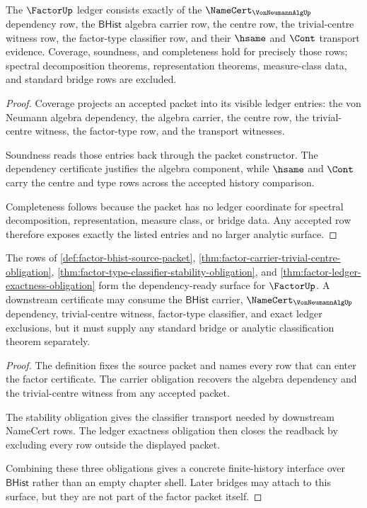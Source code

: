 \begin{theorem}
\label{thm:factor-ledger-exactness-obligation}
The $\FactorUp$ ledger consists exactly of the
$\NameCert_{\VonNeumannAlgUp}$ dependency row, the $\mathsf{BHist}$ algebra
carrier row, the centre row, the trivial-centre witness row, the factor-type
classifier row, and their $\hsame$ and $\Cont$ transport evidence. Coverage,
soundness, and completeness hold for precisely those rows; spectral
decomposition theorems, representation theorems, measure-class data, and
standard bridge rows are excluded.
\end{theorem}
\begin{proof}
Coverage projects an accepted packet into its visible ledger entries: the
von Neumann algebra dependency, the algebra carrier, the centre row, the
trivial-centre witness, the factor-type row, and the transport witnesses.

Soundness reads those entries back through the packet constructor. The
dependency certificate justifies the algebra component, while $\hsame$ and
$\Cont$ carry the centre and type rows across the accepted history comparison.

Completeness follows because the packet has no ledger coordinate for spectral
decomposition, representation, measure class, or bridge data. Any accepted row
therefore exposes exactly the listed entries and no larger analytic surface.
\end{proof}

\begin{theorem}
\label{thm:factor-root-threshold-unblock-surface}
The rows of \autoref{def:factor-bhist-source-packet},
\autoref{thm:factor-carrier-trivial-centre-obligation},
\autoref{thm:factor-type-classifier-stability-obligation}, and
\autoref{thm:factor-ledger-exactness-obligation} form the dependency-ready
surface for $\FactorUp$. A downstream certificate may consume the
$\mathsf{BHist}$ carrier, $\NameCert_{\VonNeumannAlgUp}$ dependency,
trivial-centre witness, factor-type classifier, and exact ledger exclusions,
but it must supply any standard bridge or analytic classification theorem
separately.
\end{theorem}
\begin{proof}
The definition fixes the source packet and names every row that can enter the
factor certificate. The carrier obligation recovers the algebra dependency
and the trivial-centre witness from any accepted packet.

The stability obligation gives the classifier transport needed by downstream
NameCert rows. The ledger exactness obligation then closes the readback by
excluding every row outside the displayed packet.

Combining these three obligations gives a concrete finite-history interface
over $\mathsf{BHist}$ rather than an empty chapter shell. Later bridges may
attach to this surface, but they are not part of the factor packet itself.
\end{proof}

